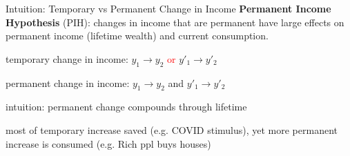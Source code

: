 \documentclass[11pt,aspectratio=169,usenames,dvipsnames]{beamer}
\newcommand{\red}[1]{\textcolor{red}{#1}}
\let\tempone\itemize
\let\temptwo\enditemize
\renewenvironment{itemize}{\tempone\addtolength{\itemsep}{\fill}}{\temptwo}
\begin{document}
\begin{frame}{Intuition: Temporary vs Permanent Change in Income}
\label{slide:Intuition__Temporary_vs_Permanent_Change_in_Income}
    \textbf{Permanent Income Hypothesis} (PIH): changes in income that are permanent have large effects on
permanent income (lifetime wealth) and current consumption.
    \begin{itemize}
        \item temporary change in income: $ y_{1} \rightarrow y_{2}  $ \red{or} $ y'_{1} \rightarrow y'_{2} $
        \item permanent change in income: $ y_{1} \rightarrow y_{2}  $ \alert{and} $ y'_{1} \rightarrow y'_{2} $
        \item intuition: permanent change compounds through lifetime
        \item most of temporary increase saved (e.g. COVID stimulus), yet more permanent increase is consumed (e.g. Rich ppl buys houses)
    \end{itemize}
\end{frame}
\end{document}
